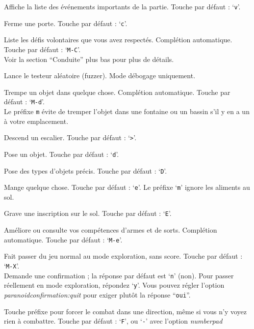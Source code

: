 \documentclass[titlepage]{article}
\begin{document}
\begin{description}[font=\mdseries\ttfamily]
\item[\#chronicle]
Affiche la liste des événements importants de la partie. Touche par défaut : `\texttt{v}'.
\item[\#close]
Ferme une porte. Touche par défaut : `\texttt{c}'.
\item[\#conduct]
Liste les défis volontaires que vous avez respectés. Complétion automatique.
Touche par défaut : `\texttt{M-C}'.\\
Voir la section ``Conduite'' plus bas pour plus de détails.
\item[\#debugfuzzer]
Lance le testeur aléatoire (fuzzer).
Mode débogage uniquement.
\item[\#dip]
Trempe un objet dans quelque chose. Complétion automatique. Touche par défaut : `\texttt{M-d}'.\\
Le préfixe \texttt{m} évite de tremper l'objet dans une fontaine ou un bassin
s'il y en a un à votre emplacement.
\item[\#down]
Descend un escalier. Touche par défaut : `\texttt{>}'.
\item[\#drop]
Pose un objet. Touche par défaut : `\texttt{d}'.
\item[\#droptype]
Pose des types d'objets précis. Touche par défaut : `\texttt{D}'.
\item[\#eat]
Mange quelque chose. Touche par défaut : `\texttt{e}'.
Le préfixe `\texttt{m}' ignore les aliments au sol.
\item[\#engrave]
Grave une inscription sur le sol. Touche par défaut : `\texttt{E}'.
\item[\#enhance]
Améliore ou consulte vos compétences d'armes et de sorts. Complétion automatique.
Touche par défaut : `\texttt{M-e}'.
\item[\#exploremode]
Fait passer du jeu normal au mode exploration, sans score.
Touche par défaut : `\texttt{M-X}'.\\
Demande une confirmation ; la réponse par défaut est `\texttt{n}' (non).
Pour passer réellement en mode exploration, répondez `\texttt{y}'.
Vous pouvez régler l'option
\textit{paranoid\textunderscore confirmation:quit}
pour exiger plutôt la réponse ``\texttt{oui}''.
\item[\#fight]
Touche préfixe pour forcer le combat dans une direction, même si vous n'y voyez
rien à combattre.
Touche par défaut : `\texttt{F}', ou `\texttt{-}' avec l'option
\textit{number\textunderscore pad}
\item[\#fire]

\end{description}
\end{document}
